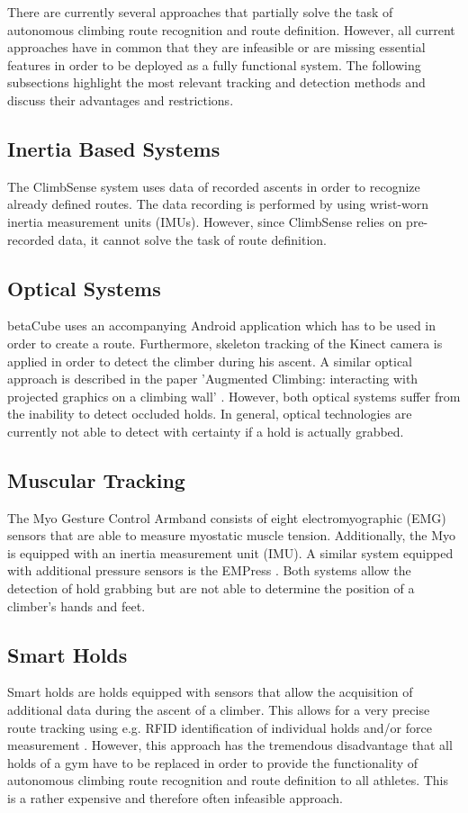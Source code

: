 There are currently several approaches that partially solve the task of autonomous climbing route recognition and route definition.
However, all current approaches have in common that they are infeasible or are missing essential features in order to be deployed as a fully functional system. 
The following subsections highlight the most relevant tracking and detection methods and discuss their advantages and restrictions. 

\subsection{Inertia Based Systems}
The ClimbSense system \cite{pub7648, Kosmalla:2015:CAC:2702123.2702311} uses data of recorded ascents in order to recognize already defined routes. 
The data recording is performed by using wrist-worn inertia measurement units (IMUs).
However, since ClimbSense relies on pre-recorded data, it cannot solve the task of route definition.


\subsection{Optical Systems}
betaCube \cite{pub8245, Wiehr:2016:BET:2851581.2892393} uses an accompanying Android application which has to be used in order to create a route. 
Furthermore, skeleton tracking of the Kinect camera is applied in order to detect the climber during his ascent.
A similar optical approach is described in the paper 'Augmented Climbing: interacting with projected graphics on a climbing wall' \cite{Kajastila:2014:ACI:2611780.2581139, Kajastila:2014:ACI:2559206.2581139}.
However, both optical systems suffer from the inability to detect occluded holds. 
In general, optical technologies are currently not able to detect with certainty if a hold is actually grabbed.

\subsection{Muscular Tracking}
The Myo Gesture Control Armband \cite{Myo:Online} consists of eight electromyographic (EMG) sensors that are able to measure myostatic muscle tension. 
Additionally, the Myo is equipped with an inertia measurement unit (IMU). 
A similar system equipped with additional pressure sensors is the EMPress \cite{McIntosh:2016:EPH:2858036.2858093}. 
Both systems allow the detection of hold grabbing but are not able to determine the position of a climber's hands and feet.

\subsection{Smart Holds}
Smart holds are holds equipped with sensors that allow the acquisition of additional data during the ascent of a climber. 
This allows for a very precise route tracking using e.g. RFID identification of individual holds and/or force measurement \cite{Kistler:Online, Lechner:Online}. 
However, this approach has the tremendous disadvantage that all holds of a gym have to be replaced in order to provide the functionality of autonomous climbing route recognition and route definition to all athletes. 
This is a rather expensive and therefore often infeasible approach.
